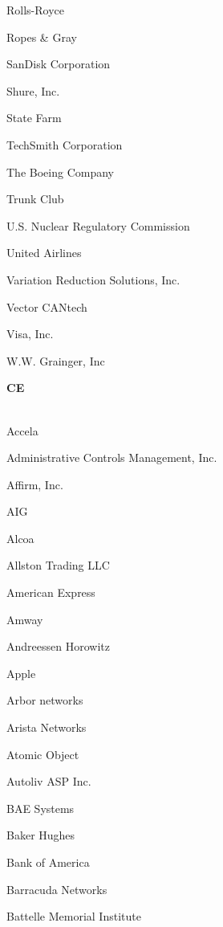 \documentclass[twoside]{article}
\begin{document}
\begin{center}
\begin{multicols}{5}
\begin{FlushLeft}
\begin{compactitem}
\item Rolls-Royce
\item Ropes \& Gray
\item SanDisk Corporation
\item Shure, Inc.
\item State Farm
\item TechSmith Corporation
\item The Boeing Company
\item Trunk Club
\item U.S. Nuclear Regulatory Commission
\item United Airlines
\item Variation Reduction Solutions, Inc.
\item Vector CANtech
\item Visa, Inc.
\item W.W. Grainger, Inc
\end{compactitem}
        \end{FlushLeft}
        \vspace{1em}
        {\fontsize{14}{16}\selectfont \bf CE}\\
        \vspace{-1em}
        ~\hrulefill~
        \vspace{-.9em}
        \begin{FlushLeft}
        \begin{compactitem}
        \item Accela
\item Administrative Controls Management, Inc.
\item Affirm, Inc.
\item AIG
\item Alcoa
\item Allston Trading LLC
\item American Express
\item Amway
\item Andreessen Horowitz
\item Apple
\item Arbor networks
\item Arista Networks
\item Atomic Object
\item Autoliv ASP Inc.
\item BAE Systems
\item Baker Hughes
\item Bank of America
\item Barracuda Networks
\item Battelle Memorial Institute

\end{compactitem}
\end{FlushLeft}
\end{multicols}
\end{center}
\end{document}
